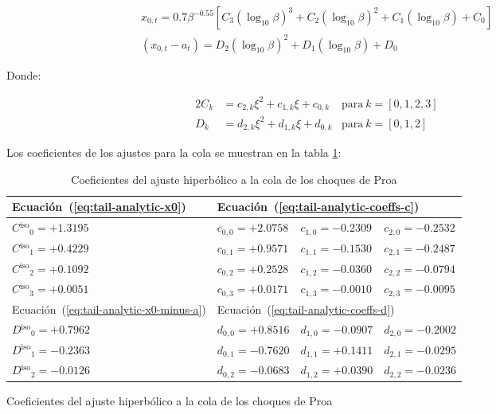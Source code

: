 \begin{figure}
 \begin{align}
   x_{0,t} = 0.7\beta^{-0.55}\left[C_3\left(\log_{10}\beta\right)^3 + C_2\left(\log_{10}\beta\right)^2 +
   C_1\left(\log_{10}\beta\right) + C_0\right] \label{eq:tail-analytic-x0}\\
   (x_{0,t} - a_t) = D_2\left(\log_{10}\beta\right)^2 + D_1\left(\log_{10}\beta\right) + D_0
   \label{eq:tail-analytic-x0-minus-a}
 \end{align}

 Donde:
 
 \begin{alignat}{2}
   \label{eq:tail-analytic-coeffs-c}
   C_k &= c_{2,k}\xi^2 + c_{1,k}\xi + c_{0,k} & \mathrm{para~}k=[0,1,2,3] \\
   \label{eq:tail-analytic-coeffs-d}
   D_k &= d_{2,k}\xi^2 + d_{1,k}\xi + d_{0,k} & \mathrm{para~}k=[0,1,2]
 \end{alignat}

 Los coeficientes de los ajustes para la cola se muestran en la tabla \ref{tab:tail-fit-coeffs}:


\newcommand\iso{\ensuremath{^{\mathrm{iso}}}}

\begin{table}
  \caption{Coeficientes del ajuste hiperbólico a la cola de los choques de Proa}
  \label{tab:tail-fit-coeffs}
  \renewcommand\arraystretch{1.2}
  \setlength\tabcolsep{0.5\tabcolsep}
  \begin{tabular}{@{}llll@{}}
    \toprule
    Ecuación~(\ref{eq:tail-analytic-x0}) & 
    \multicolumn{3}{l}{
    Ecuación~(\ref{eq:tail-analytic-coeffs-c}) \dotfill
    } \\ \midrule
    \( C\iso_0 = +1.3195     \)    
    & \( c_{0,0} = +2.0758   \)  
    & \( c_{1,0} = -0.2309   \)  
    & \( c_{2,0} = -0.2532   \)\\
      \( C\iso_1 = +0.4229     \)    
    & \( c_{0,1} = +0.9571   \)  
    & \( c_{1,1} = -0.1530   \)  
    & \( c_{2,1} = -0.2487   \)\\
      \( C\iso_2 = +0.1092     \)    
    & \( c_{0,2} = +0.2528   \)  
    & \( c_{1,2} = -0.0360   \)  
    & \( c_{2,2} = -0.0794   \)\\
      \( C\iso_3 = +0.0051     \)    
    & \( c_{0,3} = +0.0171   \)  
    & \( c_{1,3} = -0.0010   \)  
    & \( c_{2,3} = -0.0095   \)\\ \midrule
    Ecuación~(\ref{eq:tail-analytic-x0-minus-a}) &
    \multicolumn{3}{l}{
    Ecuación~(\ref{eq:tail-analytic-coeffs-d}) \dotfill
    } \\ \midrule
    \( D\iso_0 = +0.7962   \)    
    & \( d_{0,0} = +0.8516 \)  
    & \( d_{1,0} = -0.0907 \)  
    & \( d_{2,0} = -0.2002 \)\\
      \( D\iso_1 = -0.2363   \)    
    & \( d_{0,1} = -0.7620 \)  
    & \( d_{1,1} = +0.1411 \)  
    & \( d_{2,1} = -0.0295 \)\\
      \( D\iso_2 = -0.0126   \)    
    & \( d_{0,2} = -0.0683 \)  
    & \( d_{1,2} = +0.0390 \)  
    & \( d_{2,2} = -0.0236 \)\\
    \bottomrule
  \end{tabular}
\end{table}


\end{figure}
